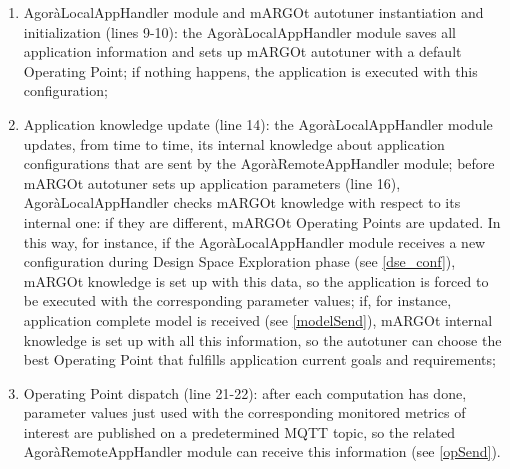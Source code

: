 \begin{enumerate}

    \item AgoràLocalAppHandler module and mARGOt autotuner instantiation and initialization (lines 9-10): the AgoràLocalAppHandler module saves all application information and sets up mARGOt autotuner with a default Operating Point; if nothing happens, the application is executed with this configuration;
    
    \item Application knowledge update (line 14): the AgoràLocalAppHandler module updates, from time to time, its internal knowledge about application configurations that are sent by the AgoràRemoteAppHandler module; before mARGOt autotuner sets up application parameters (line 16), AgoràLocalAppHandler checks mARGOt knowledge with respect to its internal one: if they are different, mARGOt Operating Points are updated. In this way, for instance, if the AgoràLocalAppHandler module receives a new configuration during Design Space Exploration phase (see \ref{dse_conf}), mARGOt knowledge is set up with this data, so the application is forced to be executed with the corresponding parameter values; if, for instance, application complete model is received (see \ref{modelSend}), mARGOt internal knowledge is set up with all this information, so the autotuner can choose the best Operating Point that fulfills application current goals and requirements;
    
    \item Operating Point dispatch (line 21-22): after each computation has done, parameter values just used with the corresponding monitored metrics of interest are published on a predetermined MQTT topic, so the related AgoràRemoteAppHandler module can receive this information (see \ref{opSend}).
    
\end{enumerate}
